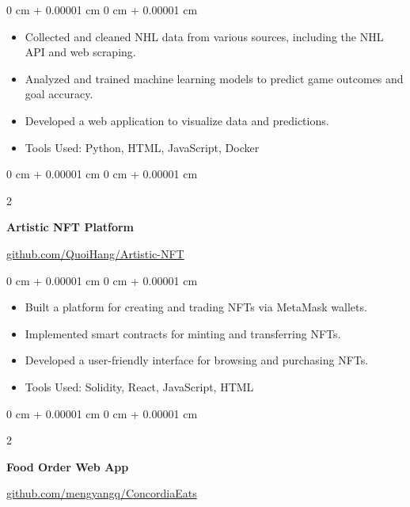 \documentclass[10pt, letterpaper]{article}
\newenvironment{highlights}{
    \begin{itemize}[
        topsep=0.10 cm,
        parsep=0.10 cm,
        partopsep=0pt,
        itemsep=0pt,
        leftmargin=0 cm + 10pt
    ]
}{
    \end{itemize}
} %
\newenvironment{onecolentry}{
    \begin{adjustwidth}{
        0 cm + 0.00001 cm
    }{
        0 cm + 0.00001 cm
    }
}{
    \end{adjustwidth}
} %
\newenvironment{twocolentry}[2][]{
    \onecolentry
    \def\secondColumn{#2}
    \setcolumnwidth{\fill, 6.5 cm}
    \begin{paracol}{2}
}{
    \switchcolumn \raggedleft \secondColumn
    \end{paracol}
    \endonecolentry
} %
\begin{document}
        \vspace{0.10 cm}
        \begin{onecolentry}
            \begin{highlights}
                \item Collected and cleaned NHL data from various sources, including the NHL API and web scraping.
                \item Analyzed and trained machine learning models to predict game outcomes and goal accuracy.
                \item Developed a web application to visualize data and predictions.
                \item Tools Used: Python, HTML, JavaScript, Docker
            \end{highlights}
        \end{onecolentry}


        \vspace{0.2 cm}

        \begin{twocolentry}{
            \href{https://github.com/QuoiHang/Artistic-NFT}{github.com/QuoiHang/Artistic-NFT}
        }
            \textbf{Artistic NFT Platform}
        \end{twocolentry}

        \vspace{0.10 cm}
        \begin{onecolentry}
            \begin{highlights}
                \item Built a platform for creating and trading NFTs via MetaMask wallets.
                \item Implemented smart contracts for minting and transferring NFTs.
                \item Developed a user-friendly interface for browsing and purchasing NFTs.
                \item Tools Used: Solidity, React, JavaScript, HTML
            \end{highlights}
        \end{onecolentry}


        \vspace{0.2 cm}

        \begin{twocolentry}{
            \href{https://github.com/mengyangq/ConcordiaEats}{github.com/mengyangq/ConcordiaEats}
        }
            \textbf{Food Order Web App}
        \end{twocolentry}
\end{document}
